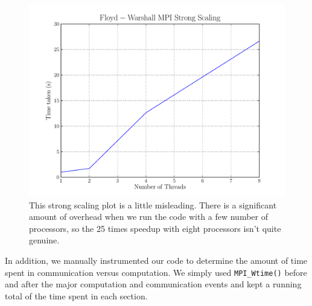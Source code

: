 \documentclass[12pt]{article}
\begin{document}
\begin{figure}
  \centering
  \includegraphics[scale=0.7]{../profiling/mpi_strong.pdf}
  \caption{This strong scaling plot is a little misleading. There
    is a significant amount of overhead when we run the code with
    a few number of processors, so the 25 times speedup with eight
    processors isn't quite genuine.}
\end{figure}

\noindent In addition, we manually instrumented our code to determine the
amount of time spent in communication versus computation. We simply used
{\tt MPI\_Wtime()} before and after the major computation and communication
events and kept a running total of the time spent in each section.
\end{document}
